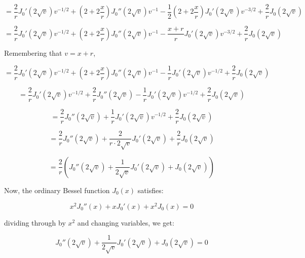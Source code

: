 \documentclass{article}
\begin{document}
\begin{equation*}
=\frac{2}{r} J_0'(2\sqrt{v}) v^{-1/2} + (2+2\frac{x}{r}) J_0''(2\sqrt{v}) v^{-1} - \frac{1}{2} (2+2\frac{x}{r}) J_0'(2\sqrt{v}) v^{-3/2} + \frac{2}{r} J_0(2\sqrt{v})
\end{equation*}

\begin{equation*}
=\frac{2}{r} J_0'(2\sqrt{v}) v^{-1/2} + (2+2\frac{x}{r}) J_0''(2\sqrt{v}) v^{-1} - \frac{x+r}{r} J_0'(2\sqrt{v}) v^{-3/2}
+ \frac{2}{r} J_0(2\sqrt{v})
\end{equation*}

Remembering that $v=x+r$,

\begin{equation*}
=\frac{2}{r} J_0'(2\sqrt{v}) v^{-1/2} + (2+2\frac{x}{r}) J_0''(2\sqrt{v}) v^{-1} - \frac{1}{r} J_0'(2\sqrt{v}) v^{-1/2}
+ \frac{2}{r} J_0(2\sqrt{v})
\end{equation*}

\begin{equation*}
=\frac{2}{r} J_0'(2\sqrt{v}) v^{-1/2} + \frac{2}{r} J_0''(2\sqrt{v}) - \frac{1}{r} J_0'(2\sqrt{v}) v^{-1/2}
+ \frac{2}{r} J_0(2\sqrt{v})
\end{equation*}

\begin{equation*}
=\frac{2}{r} J_0''(2\sqrt{v}) + \frac{1}{r} J_0'(2\sqrt{v}) v^{-1/2} + \frac{2}{r} J_0(2\sqrt{v})
\end{equation*}

\begin{equation*}
=\frac{2}{r} J_0''(2\sqrt{v}) + \frac{2}{r\cdot2\sqrt{v}} J_0'(2\sqrt{v}) + \frac{2}{r} J_0(2\sqrt{v})
\end{equation*}

\begin{equation}
\label{last eq in derivation}
=\frac{2}{r} \left( J_0''(2\sqrt{v}) + \frac{1}{2\sqrt{v}} J_0'(2\sqrt{v}) + J_0(2\sqrt{v})\right)
\end{equation}

Now, the ordinary Bessel function $J_0(x)$ satisfies:

\begin{equation*}
x^2 J_0''(x) + xJ_0'(x) + x^2J_0(x) = 0
\end{equation*}

dividing through by $x^2$ and changing variables, we get:

\begin{equation*}
J_0''(2\sqrt{v}) + \frac{1}{2\sqrt{v}}J_0'(2\sqrt{v}) + J_0(2\sqrt{v}) = 0
\end{equation*}
\end{document}
